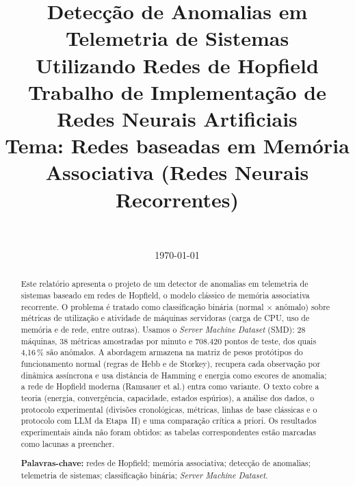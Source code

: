 \documentclass[a4paper,11pt]{article}
\title{\textbf{Detecção de Anomalias em Telemetria de Sistemas\\ Utilizando Redes de Hopfield}\\[0.8em]
  \large Trabalho de Implementação de Redes Neurais Artificiais\\
  \large Tema: Redes baseadas em Memória Associativa (Redes Neurais Recorrentes)}
\author{\apreencher[nome do integrante 1] \and \apreencher[nome do integrante 2] \and
  \apreencher[nome do integrante 3]\\[0.6em]
  \small \apreencher[instituição, curso e disciplina]}
\date{\today}
\begin{document}
\maketitle

\begin{abstract}
Este relatório apresenta o projeto de um detector de anomalias em telemetria de sistemas baseado em
redes de Hopfield, o modelo clássico de memória associativa recorrente. O problema é tratado como
classificação binária (normal $\times$ anômalo) sobre métricas de utilização e atividade de máquinas
servidoras (carga de CPU, uso de memória e de rede, entre outras). Usamos o \emph{Server Machine Dataset}
(SMD): 28 máquinas, 38 métricas amostradas por minuto e 708.420 pontos de teste, dos quais 4,16\,\% são
anômalos. A abordagem armazena na matriz de pesos protótipos do funcionamento normal (regras de Hebb e de
Storkey), recupera cada observação por dinâmica assíncrona e usa distância de Hamming e energia como escores
de anomalia; a rede de Hopfield moderna (Ramsauer et al.) entra como variante. O texto cobre a teoria
(energia, convergência, capacidade, estados espúrios), a análise dos dados, o protocolo experimental
(divisões cronológicas, métricas, linhas de base clássicas e o protocolo com LLM da Etapa~II) e uma
comparação crítica a priori. Os resultados experimentais ainda não foram obtidos: as tabelas
correspondentes estão marcadas como lacunas a preencher.

\medskip
\noindent\textbf{Palavras-chave:} redes de Hopfield; memória associativa; detecção de anomalias;
telemetria de sistemas; classificação binária; \emph{Server Machine Dataset}.
\end{abstract}

\thispagestyle{empty}
\newpage
\setcounter{tocdepth}{2}
\tableofcontents
\newpage











\appendix
\renewcommand{\thesection}{\Alph{section}}







\end{document}
